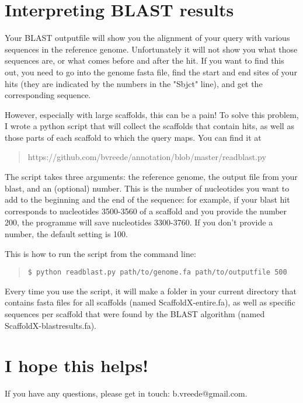 \documentclass[12pt]{article}
\begin{document}
\section{Interpreting BLAST results}
Your BLAST outputfile will show you the alignment of your query with various sequences in the reference genome. Unfortunately it will not show you what those sequences are, or what comes before and after the hit. If you want to find this out, you need to go into the genome fasta file, find the start and end sites of your hits (they are indicated by the numbers in the "Sbjct" line), and get the corresponding sequence.\par
However, especially with large scaffolds, this can be a pain! To solve this problem, I wrote a python script that will collect the scaffolds that contain hits, as well as those parts of each scaffold to which the query maps. You can find it at
\begin{quote}https://github.com/bvreede/annotation/blob/master/readblast.py
\end{quote}
The script takes three arguments: the reference genome, the output file from your blast, and an (optional) number. This is the number of nucleotides you want to add to the beginning and the end of the sequence: for example, if your blast hit corresponds to nucleotides 3500-3560 of a scaffold and you provide the number 200, the programme will save nucleotides 3300-3760. If you don't provide a number, the default setting is 100.\par
This is how to run the script from the command line:
\begin{quote}
\begin{verbatim}
$ python readblast.py path/to/genome.fa path/to/outputfile 500
\end{verbatim}
\end{quote}
Every time you use the script, it will make a folder in your current directory that contains fasta files for all scaffolds (named ScaffoldX-entire.fa), as well as specific sequences per scaffold that were found by the BLAST algorithm (named ScaffoldX-blastresults.fa).\par
\section*{I hope this helps!}
If you have any questions, please get in touch: b.vreede@gmail.com.
\end{document}
